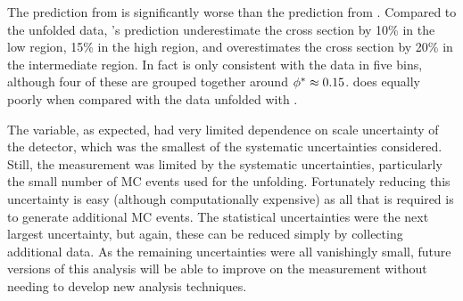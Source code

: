 The prediction from \POWHEG is significantly worse than the prediction from
\MADGRAPH. Compared to the \MADGRAPH unfolded data, \POWHEG's prediction
underestimate the cross section by 10\% in the low \phistar region, 15\% in the
high \phistar region, and overestimates the cross section by 20\% in the
intermediate region. In fact \POWHEG is only consistent with the data in five
bins, although four of these are grouped together around $\phi^{*} \approx
0.15$. \POWHEG does equally poorly when compared with the data unfolded with
\POWHEG.

The \phistar variable, as expected, had very limited dependence on \pt scale
uncertainty of the detector, which was the smallest of the systematic
uncertainties considered. Still, the measurement was limited by the systematic
uncertainties, particularly the small number of MC events used for the
unfolding. Fortunately reducing this uncertainty is easy (although
computationally expensive) as all that is required is to generate additional MC
events. The statistical uncertainties were the next largest uncertainty, but
again, these can be reduced simply by collecting additional data. As the
remaining uncertainties were all vanishingly small, future versions of this
analysis will be able to improve on the measurement without needing to develop
new analysis techniques.

